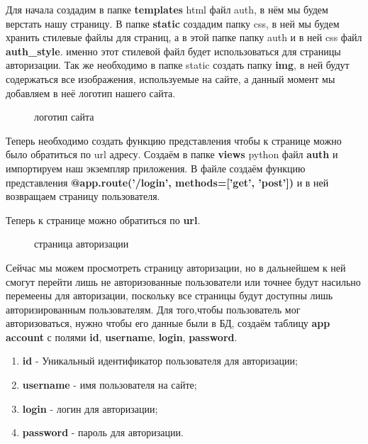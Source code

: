 \documentclass[12pt, oldlfont, amsfonts]{report}
\begin{document}
Для начала создадим в папке {\bf templates} html файл {auth}, в нём мы будем верстать нашу страницу. В папке {\bf static} создадим папку {css}, в ней мы будем хранить стилевые файлы для страниц, а в этой папке папку {auth} и в ней css файл {\bf auth\_style}. именно этот стилевой файл будет использоваться для страницы авторизации. Так же необходимо в папке {static} создать папку {\bf img}, в ней будут содержаться все изображения, используемые на сайте, а данный момент мы добавляем в неё логотип нашего сайта.
\begin{figure}[h!]
\caption{логотип сайта}
\end{figure}

Теперь необходимо создать функцию представления чтобы к странице можно было обратиться по {url} адресу. Создаём в папке {\bf views} python файл {\bf auth} и импортируем наш экземпляр приложения. В файле создаём функцию представления {\bf @app.route('/login', methods=['get', 'post'])} и в ней возвращаем страницу пользователя.

Теперь к странице можно обратиться по {\bf url}.
\begin{figure}[h!]
\caption{страница авторизации}
\end{figure}

Сейчас мы можем просмотреть страницу авторизации, но в дальнейшем к ней смогут перейти лишь не авторизованные пользователи или точнее будут насильно перемеены для авторизации, поскольку все страницы будут доступны лишь авторизированным пользователям. Для того,чтобы пользователь мог авторизоваться, нужно чтобы его данные были в БД, создаём таблицу {\bf app account} с полями {\bf id}, {\bf username}, {\bf login}, {\bf password}.

\begin{enumerate}
\item {\bf id} - Уникальный идентификатор пользователя для авторизации;
\item {\bf username} - имя пользователя на сайте;
\item {\bf login} - логин для авторизации;
\item {\bf password} - пароль для авторизации.
\end{enumerate}
\end{document}
